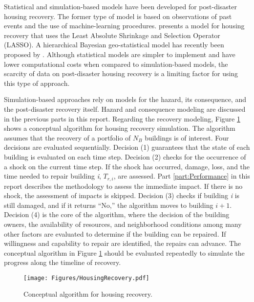 Statistical and simulation-based models have been developed for post-disaster housing recovery. The former type of model is based on observations of past events and the use of machine-learning procedures. \citet{nejat2012agent} presents a model for housing recovery that uses the Least Absolute Shrinkage and Selection Operator (LASSO). A hierarchical Bayesian geo-statistical model has recently been proposed by \citet{nejat2020spatially}. Although statistical models are simpler to implement and have lower computational costs when compared to simulation-based models, the scarcity of data on post-disaster housing recovery is a limiting factor for using this type of approach.\ 

Simulation-based approaches rely on models for the hazard, its consequence, and the post-disaster recovery itself. Hazard and consequence modeling are discussed in the previous parts in this report. Regarding the recovery modeling, Figure \ref{fig:HousingRecovery} shows a conceptual algorithm for housing recovery simulation. The algorithm assumes that the recovery of a portfolio of $N_B$ buildings is of interest. Four decisions are evaluated sequentially. Decision (1) guarantees that the state of each building is evaluated on each time step. Decision (2) checks for the occurrence of a shock on the current time step. If the shock has occurred, damage, loss, and the time needed to repair building \textit{i}, $T_{r,i}$, are assessed. Part \ref{part:Performance} in this report describes the methodology to assess the immediate impact. If there is no shock, the assessment of impacts is skipped. Decision (3) checks if building \textit{i} is still damaged, and if it returns ``No,'' the algorithm moves to building $i+1$. Decision (4) is the core of the algorithm, where the decision of the building owners, the availability of resources, and neighborhood conditions among many other factors are evaluated to determine if the building can be repaired. If willingness and capability to repair are identified, the repairs can advance. The conceptual algorithm in Figure \ref{fig:HousingRecovery} should be evaluated repeatedly to simulate the progress along the timeline of recovery.\ 

\begin{figure}[htb]
    \centering
    \texttt{[image: Figures/HousingRecovery.pdf]}
    \caption{Conceptual algorithm for housing recovery.}
    \label{fig:HousingRecovery}
\end{figure}

